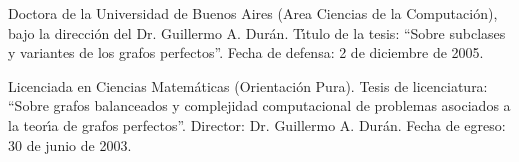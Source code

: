\item Doctora de la Universidad de Buenos Aires (Area Ciencias de
la Computaci\'on), bajo la direcci\'on del Dr. Guillermo A.
Dur\'an. T\'{\i}tulo de la tesis: ``Sobre subclases y variantes de
los grafos perfectos''. Fecha de defensa: 2 de diciembre de 2005.

\item Licenciada en Ciencias Matem\'aticas (Orientaci\'on Pura).
Tesis de licenciatura: ``Sobre grafos balanceados y complejidad
computacional de problemas asociados a la teor\'{\i}a de grafos
perfectos''. Director: Dr. Guillermo A. Dur\'an. Fecha de egreso:
30 de junio de 2003.
